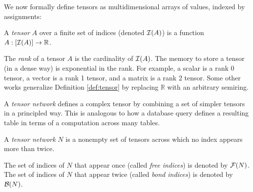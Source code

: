 
We now formally define tensors as multidimensional arrays of values, indexed by assignments:
\begin{definition}[Tensor] \label{def:tensor}
	A \emph{tensor} $A$ over a finite set of indices (denoted $\mathcal{I}(A)$) is a function $A: [\mathcal{I}(A)] \rightarrow \mathbb{R}$.
\end{definition}

The \emph{rank} of a tensor $A$ is the cardinality of $\mathcal{I}(A)$. The memory to store a tensor (in a dense way) is exponential in the rank. For example, a scalar is a rank 0 tensor, a vector is a rank 1 tensor, and a matrix is a rank 2 tensor. Some other works generalize Definition \ref{def:tensor} by replacing $\mathbb{R}$ with an arbitrary semiring. %

A \emph{tensor network} defines a complex tensor by combining a set of simpler tensors in a principled way. This is analogous to how a database query defines a resulting table in terms of a computation across many tables.

\begin{definition}
	\label{def:tensor-contraction-network}
	A \emph{tensor network} $N$ is a nonempty set of tensors across which no index appears more than twice.
\end{definition}
The set of indices of $N$ that appear once (called \emph{free indices}) is denoted by $\mathcal{F}(N)$. The set of indices of $N$ that appear twice (called \emph{bond indices}) is denoted by $\mathcal{B}(N)$. 
% 


